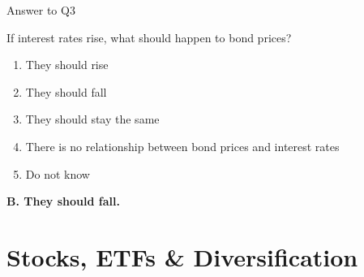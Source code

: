 \documentclass[9pt,english,aspectratio=169]{beamer}
\begin{document}
\begin{frame}{Answer to Q3}

  \begin{questionbox}
    If interest rates rise, what should happen to bond prices?
  \end{questionbox}

  \vspace{0.5em}
  \begin{enumerate}
    \item They should rise
    \item They should fall
    \item They should stay the same
    \item There is no relationship between bond prices and interest rates
    \item Do not know
  \end{enumerate}

  \pause
  \vspace{0.5em}
  \begin{answerbox}
    \textbf{B. They should fall.}
  \end{answerbox}

\end{frame}

\section{Stocks, ETFs \& Diversification}
\end{document}
